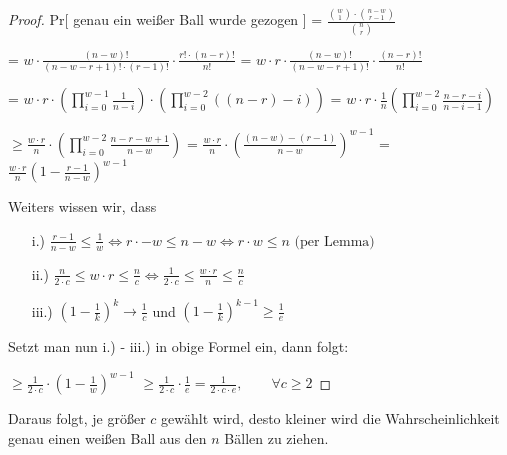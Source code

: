 \documentclass{article}
\begin{document}
\begin{proof}
  Pr[ genau ein wei{\ss}er Ball wurde gezogen ]
    = $\frac{\binom{w}{1} \cdot \binom{n - w}{r - 1}}{\binom{n}{r}}$

    = $w \cdot \frac{(n - w)!}{(n - w - r + 1)! \cdot (r - 1)!} \cdot \frac{r! \cdot (n - r)!}{n!}$
    = $w \cdot r \cdot \frac{(n - w)!}{(n - w - r + 1)!} \cdot \frac{(n - r)!}{n!}$

    = $w \cdot r \cdot \left( \prod\limits_{i = 0}^{w - 1} \frac{1}{n - i} \right) \cdot \left( \prod\limits_{i = 0}^{w - 2} \left( \left( n - r \right) - i \right) \right)$
    = $w \cdot r \cdot \frac{1}{n} \left( \prod\limits_{i = 0}^{w - 2} \frac{n - r - i}{n - i - 1} \right)$

    $\geq \frac{w \cdot r}{n} \cdot \left( \prod\limits_{i = 0}^{w - 2} \frac{n - r - w + 1}{n - w} \right)$
    = $\frac{w \cdot r}{n} \cdot \left( \frac{\left( n - w \right) - \left( r - 1 \right)}{n - w} \right)^{w - 1}$
    = $\frac{w \cdot r}{n} \left( 1 - \frac{r - 1}{n - w} \right)^{w - 1}$
   
  \bigskip
  \noindent
  Weiters wissen wir, dass
  \begin{enumerate}
    \item[i.)] $\frac{r - 1}{n - w} \leq \frac{1}{w}
        \Longleftrightarrow r \cdot  - w \leq n - w
        \Longleftrightarrow r \cdot w \leq n \text{ (per Lemma)}
      $
    \item[ii.)] $\frac{n}{2 \cdot c} \leq w \cdot r \leq \frac{n}{c}
        \Longleftrightarrow \frac{1}{2 \cdot c} \leq \frac{w \cdot r}{n} \leq \frac{n}{c}
      $
    \item[iii.)] $\left( 1 - \frac{1}{k} \right)^k \rightarrow \frac{1}{c}$ und
      $\left( 1 - \frac{1}{k} \right)^{k - 1} \geq \frac{1}{e}$
  \end{enumerate}

  \bigskip
  \noindent
  Setzt man nun i.) - iii.) in obige Formel ein, dann folgt:

  $\geq \frac{1}{2 \cdot c} \cdot \left( 1 - \frac{1}{w} \right)^{w - 1}$
  $\geq \frac{1}{2 \cdot c} \cdot \frac{1}{e} = \frac{1}{2 \cdot c \cdot e},
    \qquad \forall c \geq 2
  $
\end{proof}

\noindent
Daraus folgt, je gr{\"o}{\ss}er $c$ gew{\"a}hlt wird, desto kleiner wird die
Wahrscheinlichkeit genau einen wei{\ss}en Ball aus den $n$ B{\"a}llen zu ziehen.
\end{document}

